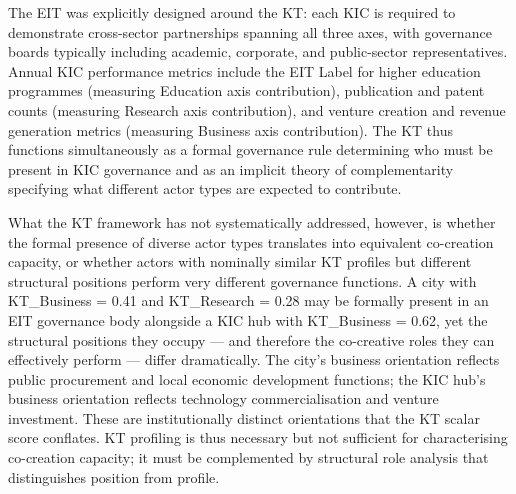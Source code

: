 \documentclass[review,12pt]{elsarticle}
\begin{document}
The EIT was explicitly designed around the KT: each KIC is required to demonstrate cross-sector partnerships spanning all three axes, with governance boards typically including academic, corporate, and public-sector representatives. Annual KIC performance metrics include the EIT Label for higher education programmes (measuring Education axis contribution), publication and patent counts (measuring Research axis contribution), and venture creation and revenue generation metrics (measuring Business axis contribution). The KT thus functions simultaneously as a formal governance rule determining who must be present in KIC governance and as an implicit theory of complementarity specifying what different actor types are expected to contribute.

What the KT framework has not systematically addressed, however, is whether the formal presence of diverse actor types translates into equivalent co-creation capacity, or whether actors with nominally similar KT profiles but different structural positions perform very different governance functions. A city with KT\_Business = 0.41 and KT\_Research = 0.28 may be formally present in an EIT governance body alongside a KIC hub with KT\_Business = 0.62, yet the structural positions they occupy --- and therefore the co-creative roles they can effectively perform --- differ dramatically. The city's business orientation reflects public procurement and local economic development functions; the KIC hub's business orientation reflects technology commercialisation and venture investment. These are institutionally distinct orientations that the KT scalar score conflates. KT profiling is thus necessary but not sufficient for characterising co-creation capacity; it must be complemented by structural role analysis that distinguishes position from profile.
\end{document}
